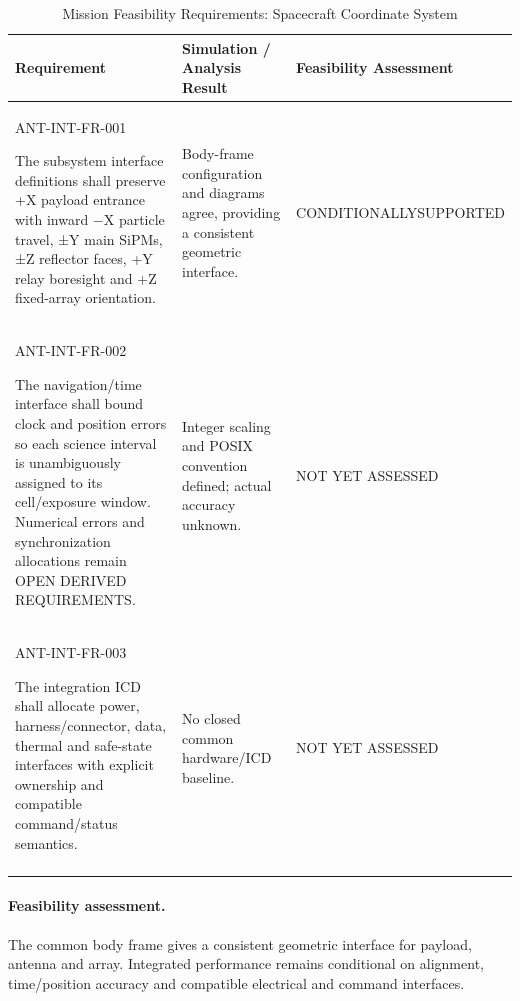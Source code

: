 \begin{table}[H]\centering\small\setlength{\tabcolsep}{3pt}
\caption{Mission Feasibility Requirements: Spacecraft Coordinate System}\label{tab:fr-int}
\begin{tabular}{@{}
>{\RaggedRight\arraybackslash}p{}
>{\RaggedRight\arraybackslash}p{}
>{\RaggedRight\arraybackslash}p{}
@{}}
\toprule Requirement & Simulation / Analysis Result & Feasibility Assessment\\\midrule
{}\label{req:ANT-INT-FR-001}\mbox{ANT-INT-}\newline\mbox{FR-001}\par The subsystem interface definitions shall preserve +X payload entrance with inward −X particle travel, ±Y main SiPMs, ±Z reflector faces, +Y relay boresight and +Z fixed-array orientation. & Body-frame configuration and diagrams agree, providing a consistent geometric interface. & CONDITIONALLY\newline SUPPORTED\\
\addlinespace[3pt]
\label{req:ANT-INT-FR-002}\mbox{ANT-INT-}\newline\mbox{FR-002}\par The navigation/time interface shall bound clock and position errors so each science interval is unambiguously assigned to its cell/exposure window. Numerical errors and synchronization allocations remain OPEN DERIVED REQUIREMENTS. & Integer scaling and POSIX convention defined; actual accuracy unknown. & NOT YET ASSESSED\\
\addlinespace[3pt]
\label{req:ANT-INT-FR-003}\mbox{ANT-INT-}\newline\mbox{FR-003}\par The integration ICD shall allocate power, harness/connector, data, thermal and safe-state interfaces with explicit ownership and compatible command/status semantics. & No closed common hardware/ICD baseline. & NOT YET ASSESSED\\
\addlinespace[3pt]
\bottomrule
\end{tabular}
\end{table}
\paragraph{Feasibility assessment.} The common body frame gives a consistent geometric interface for payload, antenna and array. Integrated performance remains conditional on alignment, time/position accuracy and compatible electrical and command interfaces.
